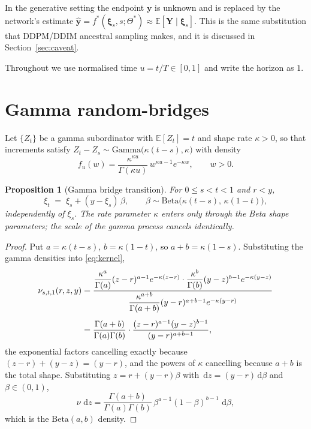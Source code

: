 \documentclass[11pt,a4paper]{article}
\newtheorem{prop}{Proposition}
\def\E{\mathbb{E}}
\def\d{\,\mathrm{d}}
\def\xib{\boldsymbol{\xi}}
\def\Yb{\boldsymbol{Y}}
\begin{document}
In the generative setting the endpoint $\boldsymbol{y}$ is unknown and is replaced by
the network's estimate $\hat{\boldsymbol{y}}=f^*(\xib_s,s;\Theta^*)\approx
\E[\Yb\mid\xib_s]$. This is the same substitution that DDPM/DDIM ancestral sampling
makes, and it is discussed in Section~\ref{sec:caveat}.

Throughout we use normalised time $u=t/T\in[0,1]$ and write the horizon as $1$.

\section{Gamma random-bridges}

Let $\{Z_t\}$ be a gamma subordinator with $\E[Z_t]=t$ and shape rate $\kappa>0$, so
that increments satisfy $Z_t-Z_s\sim\mathrm{Gamma}\big(\kappa(t-s),\kappa\big)$ with
density
\begin{equation}
f_u(w)=\frac{\kappa^{\kappa u}}{\Gamma(\kappa u)}\,w^{\kappa u-1}e^{-\kappa w},
\qquad w>0 .
\end{equation}

\begin{prop}[Gamma bridge transition]
\label{prop:gamma}
For $0\le s<t<1$ and $r<y$,
\begin{equation}
\xi_t \;=\; \xi_s + (y-\xi_s)\,\beta,
\qquad
\beta\sim\mathrm{Beta}\big(\kappa(t-s),\,\kappa(1-t)\big),
\end{equation}
independently of $\xi_s$. The rate parameter $\kappa$ enters only through the Beta
shape parameters; the scale of the gamma process cancels identically.
\end{prop}

\begin{proof}
Put $a=\kappa(t-s)$, $b=\kappa(1-t)$, so $a+b=\kappa(1-s)$. Substituting the gamma
densities into \eqref{eq:kernel},
\begin{align}
\nu_{s,t,1}(r,z,y)
&=\frac{\dfrac{\kappa^{a}}{\Gamma(a)}(z-r)^{a-1}e^{-\kappa(z-r)}
\cdot \dfrac{\kappa^{b}}{\Gamma(b)}(y-z)^{b-1}e^{-\kappa(y-z)}}
{\dfrac{\kappa^{a+b}}{\Gamma(a+b)}(y-r)^{a+b-1}e^{-\kappa(y-r)}} \notag\\[4pt]
&=\frac{\Gamma(a+b)}{\Gamma(a)\Gamma(b)}\cdot
\frac{(z-r)^{a-1}(y-z)^{b-1}}{(y-r)^{a+b-1}},
\end{align}
the exponential factors cancelling exactly because $(z-r)+(y-z)=(y-r)$, and the
powers of $\kappa$ cancelling because $a+b$ is the total shape. Substituting
$z=r+(y-r)\beta$ with $\d z=(y-r)\d\beta$ and $\beta\in(0,1)$,
\begin{equation}
\nu\,\d z=\frac{\Gamma(a+b)}{\Gamma(a)\Gamma(b)}\,
\beta^{a-1}(1-\beta)^{b-1}\,\d\beta ,
\end{equation}
which is the $\mathrm{Beta}(a,b)$ density.
\end{proof}
\end{document}
